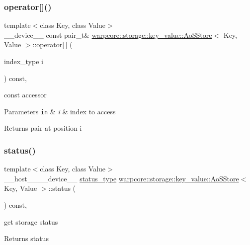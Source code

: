\subsubsection{\texorpdfstring{operator[]()}{operator[]()}\hspace{0.1cm}{\footnotesize\ttfamily [2/2]}}
{\footnotesize\ttfamily template$<$class Key, class Value$>$ \\
\+\_\+\+\_\+device\+\_\+\+\_\+ const pair\+\_\+t\& \hyperlink{classwarpcore_1_1storage_1_1key__value_1_1AoSStore}{warpcore\+::storage\+::key\+\_\+value\+::\+Ao\+S\+Store}$<$ Key, Value $>$\+::operator\mbox{[}$\,$\mbox{]} (\begin{DoxyParamCaption}\item[{index\+\_\+type}]{i }\end{DoxyParamCaption}) const\hspace{0.3cm}{\ttfamily [inline]}, {\ttfamily [noexcept]}}



const accessor 


\begin{DoxyParams}[1]{Parameters}
\mbox{\tt in}  & {\em i} & index to access \\
\hline
\end{DoxyParams}
\begin{DoxyReturn}{Returns}
pair at position {\ttfamily i} 
\end{DoxyReturn}
\mbox{\label{classwarpcore_1_1storage_1_1key__value_1_1AoSStore_a040cd6b5abf7ad6b2f20d44d5bae38bf}} 
\subsubsection{\texorpdfstring{status()}{status()}}
{\footnotesize\ttfamily template$<$class Key, class Value$>$ \\
\+\_\+\+\_\+host\+\_\+\+\_\+\+\_\+\+\_\+device\+\_\+\+\_\+ \hyperlink{classwarpcore_1_1Status}{status\+\_\+type} \hyperlink{classwarpcore_1_1storage_1_1key__value_1_1AoSStore}{warpcore\+::storage\+::key\+\_\+value\+::\+Ao\+S\+Store}$<$ Key, Value $>$\+::status (\begin{DoxyParamCaption}{ }\end{DoxyParamCaption}) const\hspace{0.3cm}{\ttfamily [inline]}, {\ttfamily [noexcept]}}



get storage status 

\begin{DoxyReturn}{Returns}
status 
\end{DoxyReturn}
